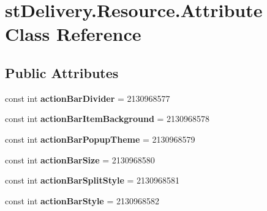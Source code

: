 \hypertarget{classst_delivery_1_1_resource_1_1_attribute}{}\section{st\+Delivery.\+Resource.\+Attribute Class Reference}
\label{classst_delivery_1_1_resource_1_1_attribute}
\subsection*{Public Attributes}
\begin{DoxyCompactItemize}
\item 
\mbox{\label{classst_delivery_1_1_resource_1_1_attribute_a3b60743ddcc2ddda35d9469d694e7c2d}} 
const int {\bfseries action\+Bar\+Divider} = 2130968577
\item 
\mbox{\label{classst_delivery_1_1_resource_1_1_attribute_a7fb54913b35bf2fe364cac2aef45ca94}} 
const int {\bfseries action\+Bar\+Item\+Background} = 2130968578
\item 
\mbox{\label{classst_delivery_1_1_resource_1_1_attribute_a2872228b803c4a09b85e1ca37c8762aa}} 
const int {\bfseries action\+Bar\+Popup\+Theme} = 2130968579
\item 
\mbox{\label{classst_delivery_1_1_resource_1_1_attribute_abda32e0eed17e9ea8c854ec17bfe0384}} 
const int {\bfseries action\+Bar\+Size} = 2130968580
\item 
\mbox{\label{classst_delivery_1_1_resource_1_1_attribute_a317e1b22655da25142fbc4ac24b5f0e7}} 
const int {\bfseries action\+Bar\+Split\+Style} = 2130968581
\item 
\mbox{\label{classst_delivery_1_1_resource_1_1_attribute_ad43b752535fc70f7a8f38c66139c0110}} 
const int {\bfseries action\+Bar\+Style} = 2130968582
\item 
\mbox{\label{classst_delivery_1_1_resource_1_1_attribute_a6ac5be88dfac1a7de4eac203b77dc65a}} 

\end{DoxyCompactItemize}

